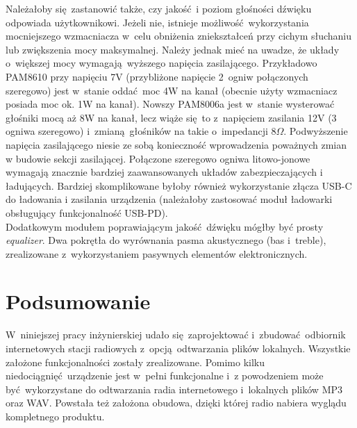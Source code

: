 \documentclass[polish]{aghengthesis}
\begin{document}
			Należałoby się zastanowić także, czy jakość i poziom głośności dźwięku odpowiada użytkownikowi. Jeżeli nie, istnieje możliwość wykorzystania mocniejszego wzmacniacza w~celu obniżenia zniekształceń przy cichym słuchaniu lub zwiększenia mocy maksymalnej.
			Należy jednak mieć na uwadze, że układy o~większej mocy wymagają wyższego napięcia zasilającego.
			Przykładowo PAM8610\textsuperscript{\cite{ch5_pam8610}} przy napięciu 7V (przybliżone napięcie 2~ogniw połączonych szeregowo) jest w~stanie oddać moc 4W na kanał (obecnie użyty wzmacniacz posiada moc ok. 1W na kanał). Nowszy PAM8006a\textsuperscript{\cite{ch5_pam8006a}} jest w~stanie wysterować głośniki mocą aż 8W na kanał, lecz wiąże się to z~napięciem zasilania 12V (3 ogniwa szeregowo) i~zmianą głośników na takie o~impedancji $8 \Omega$.
			Podwyższenie napięcia zasilającego niesie ze sobą konieczność wprowadzenia poważnych zmian w budowie sekcji zasilającej. Połączone szeregowo ogniwa litowo-jonowe wymagają znacznie bardziej zaawansowanych układów zabezpieczających i ładujących. Bardziej skomplikowane byłoby również wykorzystanie złącza USB-C do ładowania i zasilania urządzenia (należałoby zastosować moduł ładowarki obsługujący funkcjonalność USB-PD\textsuperscript{\cite{usb_pd}}).
			$ $\\
			
			Dodatkowym modułem poprawiającym jakość dźwięku mógłby być prosty \textit{equalizer}. Dwa pokrętła do wyrównania pasma akustycznego (bas i~treble), zrealizowane z~wykorzystaniem pasywnych elementów elektronicznych.
			
	\section{Podsumowanie}
	
		W~niniejszej pracy inżynierskiej udało się zaprojektować i~zbudować odbiornik internetowych stacji radiowych z~opcją odtwarzania plików lokalnych.
		Wszystkie założone funkcjonalności zostały zrealizowane. Pomimo kilku niedociągnięć urządzenie jest w~pełni funkcjonalne i~z powodzeniem może być wykorzystane do odtwarzania radia internetowego i~lokalnych plików MP3 oraz WAV. Powstała też założona obudowa, dzięki której radio nabiera wyglądu kompletnego produktu.
		
\end{document}

